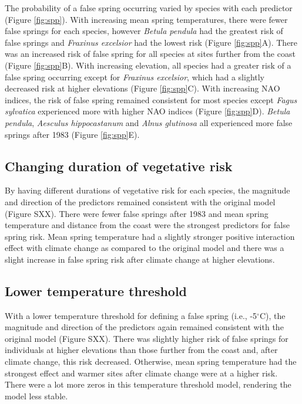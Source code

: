 \documentclass{article}\usepackage[]{graphicx}\usepackage[]{color}
\begin{document}
The probability of a false spring occurring varied by species with each predictor (Figure \ref{fig:spp}). With increasing mean spring temperatures, there were fewer false springs for each species, however \textit{Betula pendula} had the greatest risk of false springs and \textit{Fraxinus excelsior} had the lowest risk (Figure \ref{fig:spp}A). There was an increased risk of false spring for all species at sites further from the coast (Figure \ref{fig:spp}B). With increasing elevation, all species had a greater risk of a false spring occurring except for \textit{Fraxinus excelsior}, which had a slightly decreased risk at higher elevations (Figure \ref{fig:spp}C).  With increasing NAO indices, the risk of false spring remained consistent for most species except \textit{Fagus sylvatica} experienced more with higher NAO indices (Figure \ref{fig:spp}D). \textit{Betula pendula}, \textit{Aesculus hippocastanum} and \textit{Alnus glutinosa} all experienced more false springs after 1983 (Figure \ref{fig:spp}E).

\subsection*{Changing duration of vegetative risk}
By having different durations of vegetative risk for each species, the magnitude and direction of the predictors remained consistent with the original model (Figure SXX). There were fewer false springs after 1983 and mean spring temperature and distance from the coast were the strongest predictors for false spring risk. Mean spring temperature had a slightly stronger positive interaction effect with climate change as compared to the original model and there was a slight increase in false spring risk after climate change at higher elevations. 

\subsection*{Lower temperature threshold}
With a lower temperature threshold for defining a false spring (i.e., -5$^{\circ}$C), the magnitude and direction of the predictors again remained consistent with the original model (Figure SXX). There was slightly higher risk of false springs for individuals at higher elevations than those further from the coast and, after climate change, this risk decreased. Otherwise, mean spring temperature had the strongest effect and warmer sites after climate change were at a higher risk. There were a lot more zeros in this temperature threshold model, rendering the model less stable.
\end{document}
